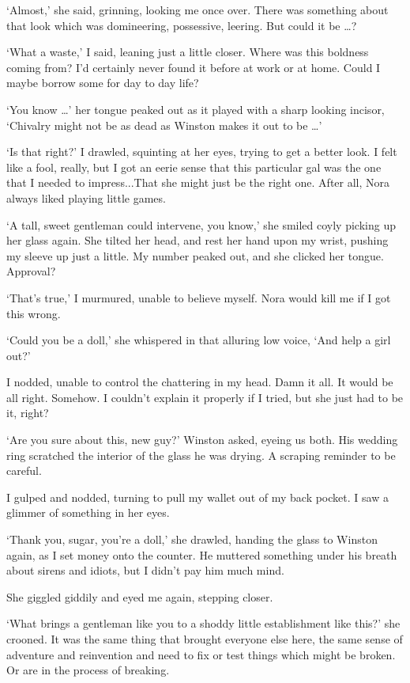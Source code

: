 `Almost,' she said, grinning, looking me once over. There was
something about that look which was domineering, possessive,
leering. But could it be \ldots ?

`What a waste,' I said, leaning just a little closer. Where was this
boldness coming from? I'd certainly never found it before at work or
at home. Could I maybe borrow some for day to day life?

`You know \ldots ' her tongue peaked out as it played with a sharp
looking incisor, `Chivalry might not be as dead as Winston makes it
out to be \ldots '

`Is that right?' I drawled, squinting at her eyes, trying to get a
better look. I felt like a fool, really, but I got an eerie sense that
this particular gal was the one that I needed to impress...That she
might just be the right one. After all, Nora always liked playing
little games.

`A tall, sweet gentleman could intervene, you know,' she smiled coyly
picking up her glass again. She tilted her head, and rest her hand
upon my wrist, pushing my sleeve up just a little. My number peaked
out, and she clicked her tongue. Approval?

`That's true,' I murmured, unable to believe myself. Nora would kill
me if I got this wrong.

`Could you be a doll,' she whispered in that alluring low voice, `And
help a girl out?'

I nodded, unable to control the chattering in my head. Damn it all. It
would be all right. Somehow. I couldn't explain it properly if I
tried, but she just had to be it, right?

 `Are you sure about this, new guy?' Winston asked, eyeing us
both. His wedding ring scratched the interior of the glass he was
drying. A scraping reminder to be careful.

I gulped and nodded, turning to pull my wallet out of my back
pocket. I saw a glimmer of something in her eyes.

`Thank you, sugar, you're a doll,' she drawled, handing the glass to
Winston again, as I set money onto the counter. He muttered something
under his breath about sirens and idiots, but I didn't pay him much
mind.

She giggled giddily and eyed me again, stepping closer.

`What brings a gentleman like you to a shoddy little establishment
like this?' she crooned. It was the same thing that brought everyone
else here, the same sense of adventure and reinvention and need to fix
or test things which might be broken. Or are in the process of
breaking.

